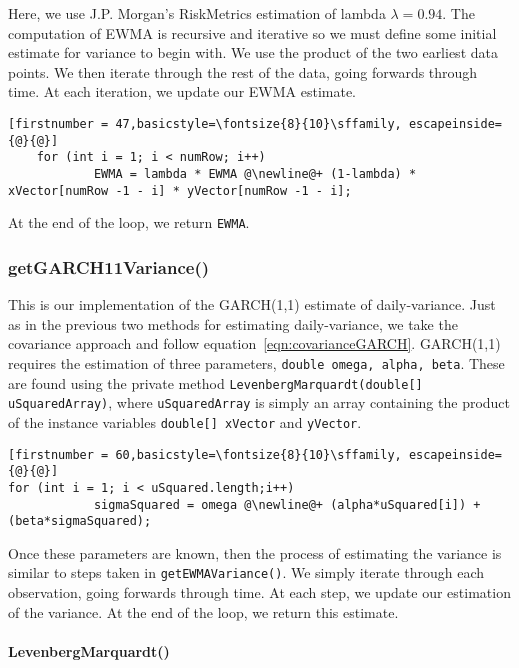 \documentclass[../Dissertation.tex]{subfiles}
\begin{document}
Here, we use J.P. Morgan's RiskMetrics estimation of lambda $\lambda = 0.94$.
The computation of EWMA is recursive and iterative so we must define some initial estimate for variance to begin with.
We use the product of the two earliest data points.
We then iterate through the rest of the data, going forwards through time.
At each iteration, we update our EWMA estimate.
\begin{lstlisting}[firstnumber = 47,basicstyle=\fontsize{8}{10}\sffamily, escapeinside={@}{@}]
	for (int i = 1; i < numRow; i++)
            EWMA = lambda * EWMA @\newline@+ (1-lambda) * xVector[numRow -1 - i] * yVector[numRow -1 - i];
\end{lstlisting}
At the end of the loop, we return \lstinline|EWMA|.

\subsubsection{getGARCH11Variance()}

This is our implementation of the GARCH(1,1) estimate of daily-variance.
Just as in the previous two methods for estimating daily-variance, we take the covariance approach and follow equation~\ref{eqn:covarianceGARCH}.
GARCH(1,1) requires the estimation of three parameters, \lstinline|double omega, alpha, beta|.
These are found using the private method \lstinline|LevenbergMarquardt(double[] uSquaredArray)|, where \lstinline|uSquaredArray| is simply an array containing the product of the instance variables \lstinline|double[] xVector| and \lstinline|yVector|.
\begin{lstlisting}[firstnumber = 60,basicstyle=\fontsize{8}{10}\sffamily, escapeinside={@}{@}]
for (int i = 1; i < uSquared.length;i++)
            sigmaSquared = omega @\newline@+ (alpha*uSquared[i]) + (beta*sigmaSquared);
\end{lstlisting}            
Once these parameters are known, then the process of estimating the variance is similar to steps taken in \lstinline|getEWMAVariance()|.
We simply iterate through each observation, going forwards through time.
At each step, we update our estimation of the variance.
At the end of the loop, we return this estimate.

\paragraph{LevenbergMarquardt()}
\end{document}
